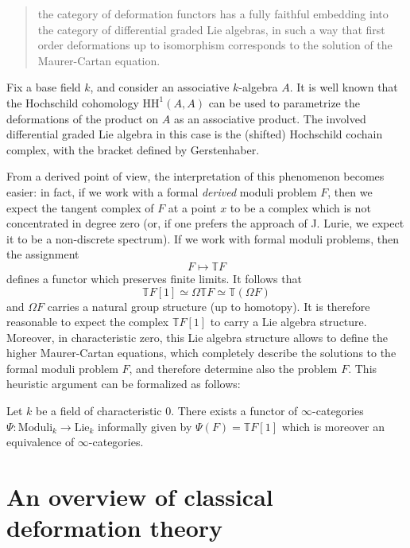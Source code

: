 \begin{refsection}
\begin{quote}
the category of deformation functors has a fully faithful embedding into the category of differential graded Lie algebras, in such a way that first order deformations up to isomorphism corresponds to the solution of the Maurer-Cartan equation.
\end{quote}

\begin{eg} \label{eg hochschild}
Fix a base field $k$, and consider an associative $k$-algebra $A$. It is well known that the Hochschild cohomology $\mathrm{HH}^1(A,A)$ can be used to parametrize the deformations of the product on $A$ as an associative product. The involved differential graded Lie algebra in this case is the (shifted) Hochschild cochain complex, with the bracket defined by Gerstenhaber.
\end{eg}

From a derived point of view, the interpretation of this phenomenon becomes easier: in fact, if we work with a formal \emph{derived} moduli problem $F$, then we expect the tangent complex of $F$ at a point $x$ to be a complex which is not concentrated in degree zero (or, if one prefers the approach of J. Lurie, we expect it to be a non-discrete spectrum). If we work with formal moduli problems, then the assignment
\[
F \mapsto \mathbb TF
\]
defines a functor which preserves finite limits. It follows that
\[
\mathbb TF[1] \simeq \Omega \mathbb TF \simeq \mathbb T(\Omega F)
\]
and $\Omega F$ carries a natural group structure (up to homotopy). It is therefore reasonable to expect the complex $\mathbb TF[1]$ to carry a Lie algebra structure. Moreover, in characteristic zero, this Lie algebra structure allows to define the higher Maurer-Cartan equations, which completely describe the solutions to the formal moduli problem $F$, and therefore determine also the problem $F$. This heuristic argument can be formalized as follows:

\begin{thm}
Let $k$ be a field of characteristic $0$. There exists a functor of $\infty$-categories $\Psi \colon \mathrm{Moduli}_k \to \mathrm{Lie}_k$ informally given by $\Psi(F) = \mathbb T F[1]$ which is moreover an equivalence of $\infty$-categories.
\end{thm}

\section{An overview of classical deformation theory}


\end{refsection}
